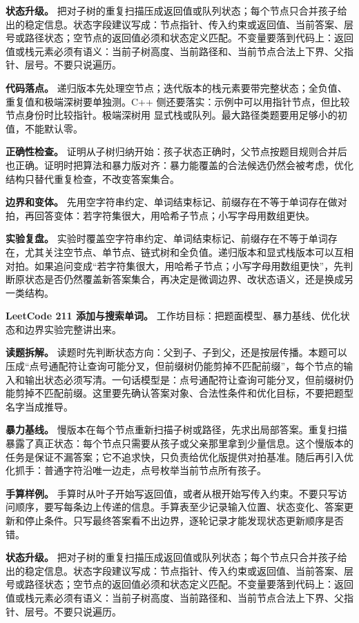 \textbf{状态升级。} 把对子树的重复扫描压成返回值或队列状态；每个节点只合并孩子给出的稳定信息。状态字段建议写成：节点指针、传入约束或返回值、当前答案、层号或路径状态；空节点的返回值必须和状态定义匹配。不变量要落到代码上：返回值或栈元素必须有语义：当前子树高度、当前路径和、当前节点合法上下界、父指针、层号。不要只说遍历。

\textbf{代码落点。} 递归版本先处理空节点；迭代版本的栈元素要带完整状态；全负值、重复值和极端深树要单独测。C++ 侧还要落实：示例中可以用指针节点，但比较节点身份时比较指针。极端深树用  显式栈或队列。最大路径类题要用足够小的初值，不能默认零。

\textbf{正确性检查。} 证明从子树归纳开始：孩子状态正确时，父节点按题目规则合并后也正确。证明时把算法和暴力版对齐：暴力能覆盖的合法候选仍然会被考虑，优化结构只替代重复检查，不改变答案集合。

\textbf{边界和变体。} 先用空字符串约定、单词结束标记、前缀存在不等于单词存在做对拍，再回答变体：若字符集很大，用哈希子节点；小写字母用数组更快。

\textbf{实验复盘。} 实验时覆盖空字符串约定、单词结束标记、前缀存在不等于单词存在，尤其关注空节点、单节点、链式树和全负值。递归版本和显式栈版本可以互相对拍。如果追问变成“若字符集很大，用哈希子节点；小写字母用数组更快”，先判断原状态是否仍然覆盖新答案集合，再决定是微调边界、改状态语义，还是换成另一类结构。

\noindent\textbf{LeetCode 211 添加与搜索单词。} 工作坊目标：把题面模型、暴力基线、优化状态和边界实验完整讲出来。

\textbf{读题拆解。} 读题时先判断状态方向：父到子、子到父，还是按层传播。本题可以压成“点号通配符让查询可能分叉，但前缀树仍能剪掉不匹配前缀”，每个节点的输入和输出状态必须写清。一句话模型是：点号通配符让查询可能分叉，但前缀树仍能剪掉不匹配前缀。这里要先确认答案对象、合法性条件和优化目标，不要把题型名字当成推导。

\textbf{暴力基线。} 慢版本在每个节点重新扫描子树或路径，先求出局部答案。重复扫描暴露了真正状态：每个节点只需要从孩子或父亲那里拿到少量信息。这个慢版本的任务是保证不漏答案；它不追求快，只负责给优化版提供对拍基准。随后再引入优化抓手：普通字符沿唯一边走，点号枚举当前节点所有孩子。

\textbf{手算样例。} 手算时从叶子开始写返回值，或者从根开始写传入约束。不要只写访问顺序，要写每条边上传递的信息。手算表至少记录输入位置、状态变化、答案更新和停止条件。只写最终答案看不出边界，逐轮记录才能发现状态更新顺序是否错。

\textbf{状态升级。} 把对子树的重复扫描压成返回值或队列状态；每个节点只合并孩子给出的稳定信息。状态字段建议写成：节点指针、传入约束或返回值、当前答案、层号或路径状态；空节点的返回值必须和状态定义匹配。不变量要落到代码上：返回值或栈元素必须有语义：当前子树高度、当前路径和、当前节点合法上下界、父指针、层号。不要只说遍历。


